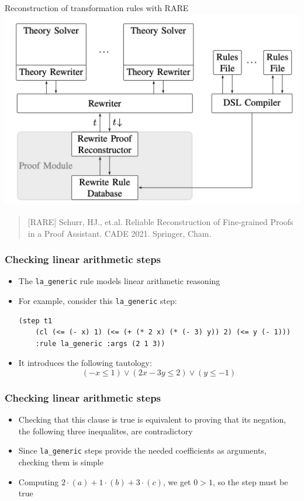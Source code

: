 \documentclass[aspectratio=169,xcolor={dvipsnames}]{beamer}
\newcommand\chighlight[2]{\setlength{\fboxsep}{0pt}\colorbox{#1}{#2\strut}}
\begin{document}
\begin{frame}{Reconstruction of transformation rules with RARE}
\centering
\includegraphics[scale=0.3]{RARE.png}
\vfill
\begin{quote}[RARE]
Schurr, HJ., et.al. Reliable Reconstruction of Fine-grained Proofs in a Proof Assistant. CADE 2021. Springer, Cham.
\end{quote}
\end{frame}

\begin{frame}[fragile]
\frametitle{Checking linear arithmetic steps}
\begin{itemize}
\item The \texttt{la\_generic} rule models linear arithmetic reasoning
\item For example, consider this \texttt{la\_generic} step:
\begin{verbatim}
(step t1
    (cl (<= (- x) 1) (<= (+ (* 2 x) (* (- 3) y)) 2) (<= y (- 1)))
    :rule la_generic :args (2 1 3))
\end{verbatim}
\item It introduces the following tautology:
$$(-x \leq 1) \lor (2x - 3y \leq 2) \lor (y \leq -1)$$
\end{itemize}
\end{frame}

\begin{frame}[fragile]
\frametitle{Checking linear arithmetic steps}
\begin{itemize}
\begin{verbatim}
(step t1
    (cl (<= (- x) 1) (<= (+ (* 2 x) (* (- 3) y)) 2) (<= y (- 1)))
    :rule la_generic |\chighlight{yellow!60}{:args (2 1 3}|))
\end{verbatim}
\item Checking that this clause is true is equivalent to proving that its
negation, the following three inequalites, are contradictory
\item Since \texttt{la\_generic} steps provide the needed coefficients as
    arguments, checking them is simple
\item Computing $2 \cdot (a) + 1 \cdot (b) + 3 \cdot (c)$, we get $0 > 1$,
    so the step must be true
\end{itemize}
\end{frame}
\end{document}
